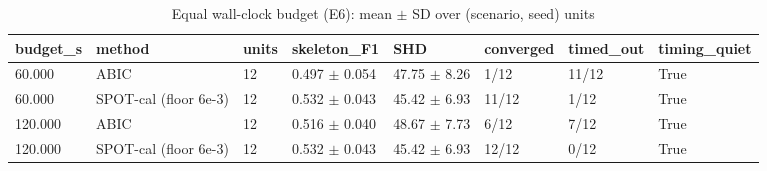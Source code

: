 \begin{table}[t]
\centering\footnotesize
\caption{Equal wall-clock budget (E6): mean $\pm$ SD over (scenario, seed) units}\label{tab:T2d_equal_budget}
\begin{tabular}{@{}llllllll@{}}
\toprule
budget\_s & method & units & skeleton\_F1 & SHD & converged & timed\_out & timing\_quiet\\
\midrule
60.000 & ABIC & 12 & 0.497 $\pm$ 0.054 & 47.75 $\pm$ 8.26 & 1/12 & 11/12 & True\\
60.000 & SPOT-cal (floor 6e-3) & 12 & 0.532 $\pm$ 0.043 & 45.42 $\pm$ 6.93 & 11/12 & 1/12 & True\\
120.000 & ABIC & 12 & 0.516 $\pm$ 0.040 & 48.67 $\pm$ 7.73 & 6/12 & 7/12 & True\\
120.000 & SPOT-cal (floor 6e-3) & 12 & 0.532 $\pm$ 0.043 & 45.42 $\pm$ 6.93 & 12/12 & 0/12 & True\\
\bottomrule
\end{tabular}
\end{table}
